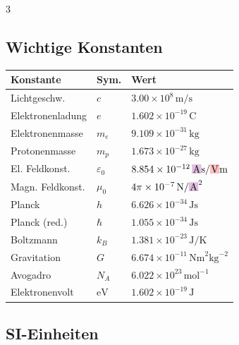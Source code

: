 \documentclass[10pt,a4paper]{article}
\newcommand{\icc}[1]{{\setlength\fboxsep{1pt}\colorbox{violet!25}{\ensuremath{#1}}}}
\newcommand{\vc}[1]{{\setlength\fboxsep{1pt}\colorbox{red!25}{\ensuremath{#1}}}}
\begin{document}
\begin{multicols}{3}

\subsection*{Wichtige Konstanten}

{\footnotesize\renewcommand{\arraystretch}{1.2}
\begin{tabularx}{\linewidth}{|X|l|X|}
\hline
\textbf{Konstante} & \textbf{Sym.} & \textbf{Wert} \\
\hline
Lichtgeschw.      & $c$               & $3.00\times10^{8}\,\text{m/s}$ \\
Elektronenladung  & $e$               & $1.602\times10^{-19}\,\text{C}$ \\
Elektronenmasse   & $m_e$             & $9.109\times10^{-31}\,\text{kg}$ \\
Protonenmasse     & $m_p$             & $1.673\times10^{-27}\,\text{kg}$ \\
El. Feldkonst.    & $\varepsilon_0$   & $8.854\times10^{-12}\,\icc{\text{A}}\text{s}/\vc{\text{V}}\text{m}$ \\
Magn. Feldkonst.  & $\mu_0$           & $4\pi\times10^{-7}\,\text{N}/\icc{\text{A}}^2$ \\
Planck             & $h$               & $6.626\times10^{-34}\,\text{Js}$ \\
Planck (red.)      & $\hbar$           & $1.055\times10^{-34}\,\text{Js}$ \\
Boltzmann         & $k_B$             & $1.381\times10^{-23}\,\text{J/K}$ \\
Gravitation       & $G$               & $6.674\times10^{-11}\,\text{Nm}^2\text{kg}^{-2}$ \\
Avogadro          & $N_A$             & $6.022\times10^{23}\,\text{mol}^{-1}$ \\
Elektronenvolt    & $\text{eV}$       & $1.602\times10^{-19}\,\text{J}$ \\
\hline
\end{tabularx}}

\subsection*{SI-Einheiten}


\end{multicols}
\end{document}
